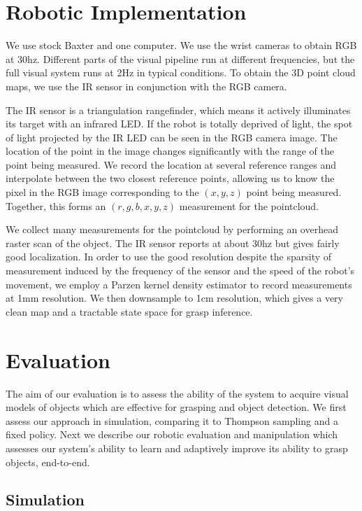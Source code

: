 \documentclass{article}
\begin{document}
\section{Robotic Implementation}

We use stock Baxter and one computer.  We use the wrist cameras to
obtain RGB at 30hz. Different parts of the visual pipeline run at
different frequencies, but the full visual system runs at 2Hz in
typical conditions.  To obtain the 3D point cloud maps, we use the IR
sensor in conjunction with the RGB camera.  

The IR sensor is a triangulation rangefinder, which means it actively
illuminates its target with an infrared LED. If the robot is totally
deprived of light, the spot of light projected by the IR LED can be seen in the RGB camera
image. The location of the point in the image changes significantly with the
range of the point being measured. We record the location at several reference ranges
and interpolate between the two closest reference points, allowing us to know the pixel
in the RGB image corresponding to the $(x,y,z)$ point being measured. Together, this
forms an $(r,g,b,x,y,z)$ measurement for the pointcloud.

We collect many measurements for the pointcloud by performing an overhead raster
scan of the object. The IR sensor reports at about 30hz but gives fairly good localization.
In order to use the good resolution despite the sparsity of measurement induced by the frequency
of the sensor and the speed of the robot's movement, we employ a Parzen kernel density 
estimator to record measurements at 1mm resolution. We then downsample to 1cm resolution, which 
gives a very clean map and a tractable state space for grasp inference.

 
\section{Evaluation}

The aim of our evaluation is to assess the ability of the system to
acquire visual models of objects which are effective for grasping and
object detection.  We first assess our approach in simulation,
comparing it to Thompson sampling and a fixed policy.  Next we
describe our robotic evaluation and manipulation which assesses our
system's ability to learn and adaptively improve its ability to grasp
objects, end-to-end.

\subsection{Simulation}
\end{document}
